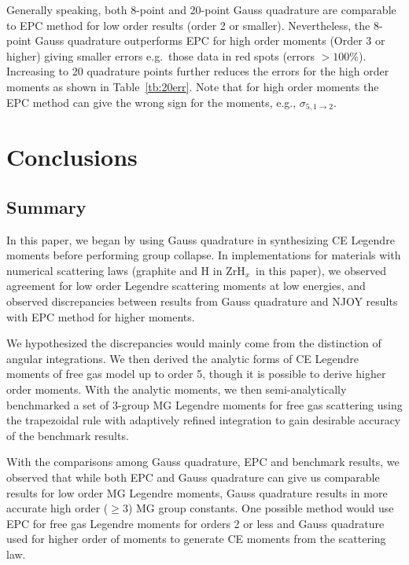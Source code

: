 \documentclass[review]{elsarticle}
\newcommand{\zh}{ZrH$_x$}
\begin{document}
Generally speaking, both 8-point and 20-point Gauss quadrature are comparable to EPC method for low order results (order 2 or smaller). Nevertheless, the 8-point Gauss quadrature  outperforms EPC for high order moments (Order 3 or higher) giving  smaller errors e.g.~those data in red spots (errors $>100\%$). Increasing to 20 quadrature points further reduces the errors for the high order moments as shown in Table~\ref{tb:20err}. Note that for high order moments the EPC method can give the wrong sign for the moments, e.g., $\sigma_{5,1\rightarrow 2}$.

\section{Conclusions}
\subsection{Summary}
In this paper, we began by using Gauss quadrature in synthesizing CE Legendre moments before performing group collapse. In implementations for materials with numerical scattering laws (graphite and H in \zh~in this paper), we observed agreement for low order Legendre scattering moments at low energies, and observed discrepancies between results from Gauss quadrature and NJOY results with EPC method for higher moments.

We hypothesized the discrepancies would mainly come from the distinction of angular integrations. We then derived the analytic forms of CE Legendre moments of free gas model up to order 5, though it is possible to derive higher order moments. With the analytic moments, we then semi-analytically benchmarked a set of 3-group MG Legendre moments for free gas scattering using the trapezoidal rule with adaptively refined integration to gain desirable accuracy of the benchmark results.

With the comparisons among Gauss quadrature, EPC and benchmark results, we observed that while both EPC and Gauss quadrature can give us comparable results for low order MG Legendre moments, Gauss quadrature results in more accurate high order ($\geq3$) MG group constants.
One possible method would use EPC  for free gas Legendre moments for orders 2 or less and Gauss quadrature used for higher order of moments to generate CE moments from the scattering law.
\end{document}
